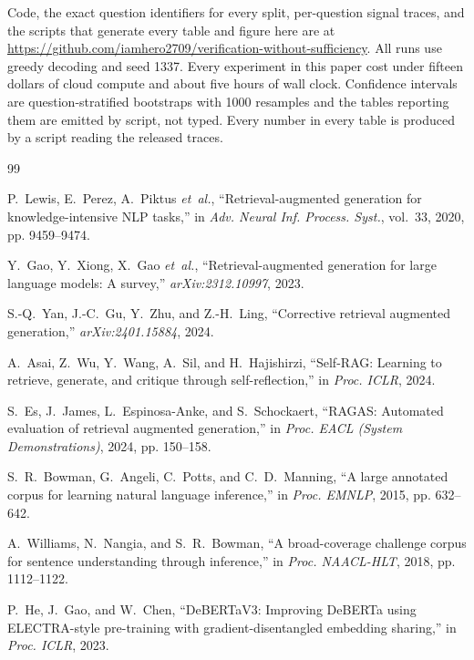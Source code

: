 \documentclass[conference]{IEEEtran}
\begin{document}
Code, the exact question identifiers for every split, per-question signal
traces, and the scripts that generate every table and figure here are at
\url{https://github.com/iamhero2709/verification-without-sufficiency}. All runs use greedy
decoding and seed 1337. Every experiment in this paper cost under fifteen
dollars of cloud compute and about five hours of wall clock.
Confidence intervals are question-stratified bootstraps with 1000 resamples and
the tables reporting them are emitted by script, not typed. Every number in
every table is produced by a script reading the released traces.

\balance

\begin{thebibliography}{99}

P.~Lewis, E.~Perez, A.~Piktus \emph{et~al.},
``Retrieval-augmented generation for knowledge-intensive {NLP} tasks,''
in \emph{Adv. Neural Inf. Process. Syst.}, vol.~33, 2020, pp. 9459--9474.

Y.~Gao, Y.~Xiong, X.~Gao \emph{et~al.},
``Retrieval-augmented generation for large language models: A survey,''
\emph{arXiv:2312.10997}, 2023.

S.-Q.~Yan, J.-C.~Gu, Y.~Zhu, and Z.-H.~Ling,
``Corrective retrieval augmented generation,''
\emph{arXiv:2401.15884}, 2024.

A.~Asai, Z.~Wu, Y.~Wang, A.~Sil, and H.~Hajishirzi,
``Self-{RAG}: Learning to retrieve, generate, and critique through
self-reflection,'' in \emph{Proc. ICLR}, 2024.

S.~Es, J.~James, L.~Espinosa-Anke, and S.~Schockaert,
``{RAGAS}: Automated evaluation of retrieval augmented generation,''
in \emph{Proc. EACL (System Demonstrations)}, 2024, pp. 150--158.

S.~R.~Bowman, G.~Angeli, C.~Potts, and C.~D.~Manning,
``A large annotated corpus for learning natural language inference,''
in \emph{Proc. EMNLP}, 2015, pp. 632--642.

A.~Williams, N.~Nangia, and S.~R.~Bowman,
``A broad-coverage challenge corpus for sentence understanding through
inference,'' in \emph{Proc. NAACL-HLT}, 2018, pp. 1112--1122.

P.~He, J.~Gao, and W.~Chen,
``{DeBERTaV3}: Improving {DeBERTa} using {ELECTRA}-style pre-training with
gradient-disentangled embedding sharing,'' in \emph{Proc. ICLR}, 2023.


\end{thebibliography}
\end{document}
